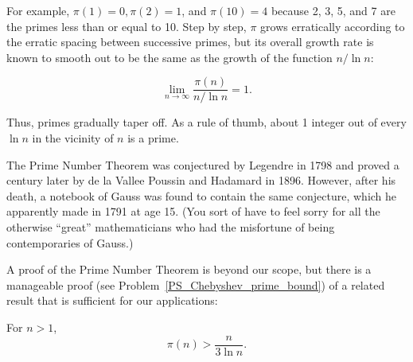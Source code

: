 For example, $\pi(1) = 0, \pi(2) = 1$, and $\pi(10) = 4$ because 2, 3,
5, and 7 are the primes less than or equal to 10.  Step by step,
$\pi$ grows erratically according to the erratic spacing between
successive primes, but its overall growth rate is known to smooth out
to be the same as the growth of the function $n/\ln n$:

\begin{theorem}
\[
\lim_{n\to\infty} \frac{\pi(n)}{n/\ln n} = 1.
\]
\end{theorem}

Thus, primes gradually taper off.  As a rule of thumb, about 1 integer
out of every $\ln n$ in the vicinity of $n$ is a prime.


The Prime Number Theorem was conjectured by Legendre in 1798 and
proved a century later by de la Vallee Poussin and Hadamard in 1896.
However, after his death, a notebook of Gauss was found to contain the
same conjecture, which he apparently made in 1791 at age 15.  (You
sort of have to feel sorry for all the otherwise ``great''
mathematicians who had the misfortune of being contemporaries of
Gauss.)

A proof of the Prime Number Theorem is beyond our scope, but there is
a manageable proof (see Problem~\ref{PS_Chebyshev_prime_bound}) of a
related result that is sufficient for our applications:
\begin{theorem}
For $n >1$,
\[
\pi(n) > \frac{n}{3 \ln n}.
\]
\end{theorem}

